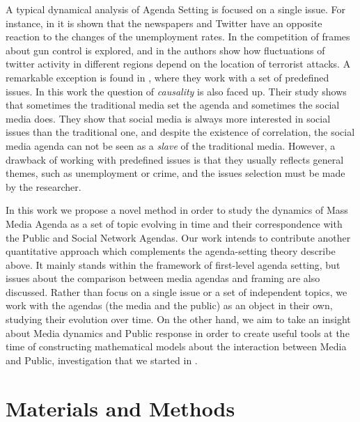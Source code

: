 \documentclass{bmcart}
\begin{document}
\par A typical dynamical analysis of Agenda Setting is focused on a single issue. For instance, in \cite{soroka2017negativity} it is shown that the newspapers and Twitter have an opposite reaction to the changes of the unemployment rates. In \cite{guggenheim2015dynamics} the competition of frames about gun control is explored, and in \cite{ali2018measuring} the authors show how fluctuations of  twitter activity in different regions depend on the location of terrorist attacks.
A remarkable exception is found in  \cite{russell2014dynamics}, where they work with a set of predefined issues. In this work the question of \emph{causality} is also faced up. Their study shows that sometimes the traditional media set the agenda and sometimes the social media does. They show that social media is always more interested in social issues than the traditional one, and despite the existence of correlation, the social media agenda can not be seen as a \emph{slave} of the traditional media.
However, a drawback of working with predefined issues is that they usually reflects general themes, such as unemployment or crime, and the issues selection must be made by the researcher. 
\par In this work we propose a novel method in order to study the dynamics of Mass Media Agenda as a set of topic evolving in time and their correspondence with the Public and Social Network Agendas.  Our work intends to contribute another quantitative approach which complements the agenda-setting theory describe above. It mainly stands within the framework of first-level agenda setting, but issues about the comparison between media agendas and framing are also discussed.
Rather than focus on a single issue or a set of independent topics, we work with the agendas (the media and the public) as an object in their own, studying their evolution over time. 
On the other hand, we aim to take an insight about Media dynamics and Public response in order to create useful tools at the time of constructing mathematical models about the interaction between Media and Public, investigation that we started in \cite{pinto2016setting}.

\section*{Materials and Methods}
 \label{sec:MatMeth}
\end{document}
